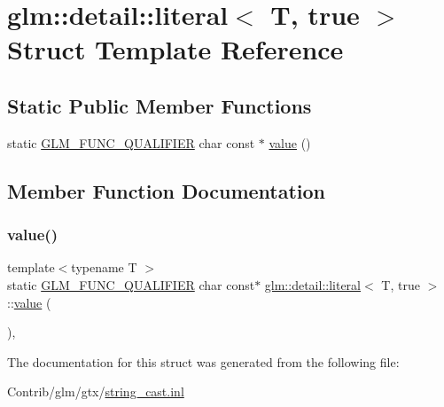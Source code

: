 \hypertarget{structglm_1_1detail_1_1literal_3_01_t_00_01true_01_4}{}\section{glm\+:\+:detail\+:\+:literal$<$ T, true $>$ Struct Template Reference}
\label{structglm_1_1detail_1_1literal_3_01_t_00_01true_01_4}
\subsection*{Static Public Member Functions}
\begin{DoxyCompactItemize}
\item 
static \mbox{\hyperlink{setup_8hpp_a33fdea6f91c5f834105f7415e2a64407}{G\+L\+M\+\_\+\+F\+U\+N\+C\+\_\+\+Q\+U\+A\+L\+I\+F\+I\+ER}} char const  $\ast$ \mbox{\hyperlink{structglm_1_1detail_1_1literal_3_01_t_00_01true_01_4_ae18b91cfeeb373f6b7c62572f88cf239}{value}} ()
\end{DoxyCompactItemize}


\subsection{Member Function Documentation}
\mbox{\label{structglm_1_1detail_1_1literal_3_01_t_00_01true_01_4_ae18b91cfeeb373f6b7c62572f88cf239}} 
\subsubsection{\texorpdfstring{value()}{value()}}
{\footnotesize\ttfamily template$<$typename T $>$ \\
static \mbox{\hyperlink{setup_8hpp_a33fdea6f91c5f834105f7415e2a64407}{G\+L\+M\+\_\+\+F\+U\+N\+C\+\_\+\+Q\+U\+A\+L\+I\+F\+I\+ER}} char const$\ast$ \mbox{\hyperlink{structglm_1_1detail_1_1literal}{glm\+::detail\+::literal}}$<$ T, true $>$\+::\mbox{\hyperlink{_s_d_l__opengl__glext_8h_a8ad81492d410ff2ac11f754f4042150f}{value}} (\begin{DoxyParamCaption}{ }\end{DoxyParamCaption})\hspace{0.3cm}{\ttfamily [inline]}, {\ttfamily [static]}}



The documentation for this struct was generated from the following file\+:\begin{DoxyCompactItemize}
\item 
Contrib/glm/gtx/\mbox{\hyperlink{string__cast_8inl}{string\+\_\+cast.\+inl}}\end{DoxyCompactItemize}
